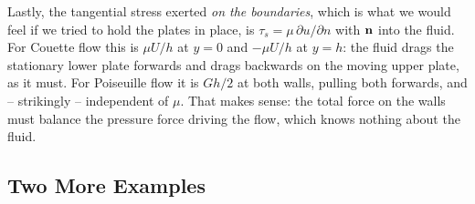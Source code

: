 \documentclass[a4paper]{scrartcl}
\begin{document}
Lastly, the tangential stress exerted \emph{on the boundaries}, which is what we would feel if we tried to hold the plates in place, is $\tau_s = \mu \, \partial u/\partial n$ with $\mathbf{n}$ into the fluid. For Couette flow this is $\mu U/h$ at $y = 0$ and $-\mu U /h$ at $y = h$: the fluid drags the stationary lower plate forwards and drags backwards on the moving upper plate, as it must. For Poiseuille flow it is $Gh/2$ at both walls, pulling both forwards, and -- strikingly -- independent of $\mu$. That makes sense: the total force on the walls must balance the pressure force driving the flow, which knows nothing about the fluid.

\subsection{Two More Examples}
\end{document}
